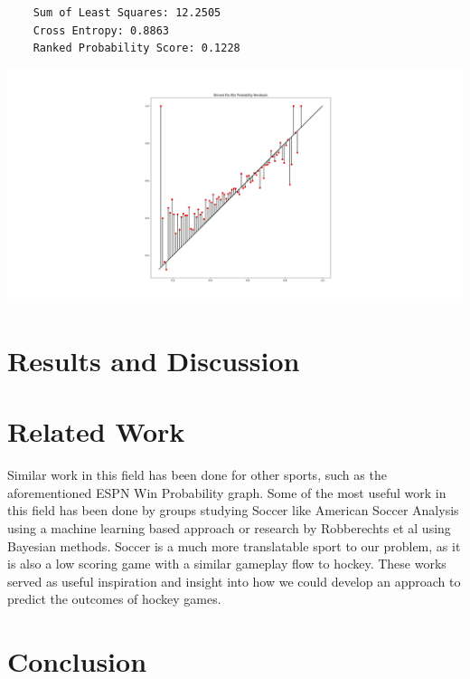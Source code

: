 \documentclass{article}
\begin{document}
\begin{minipage}{0.45\textwidth}
  \vspace*{0pt}
  \centering
  \begin{verbatim}
    Sum of Least Squares: 12.2505
    Cross Entropy: 0.8863
    Ranked Probability Score: 0.1228
  \end{verbatim}
  \end{minipage}
  \hfill
  \begin{minipage}{0.45\textwidth}
  \includegraphics[width=2\textwidth]{elo_residuals.png}\\

\end{minipage}

\section{Results and Discussion}

\section{Related Work}
Similar work in this field has been done for other sports, such as the aforementioned ESPN Win Probability graph.
Some of the most useful work in this field has been done by groups studying Soccer like American Soccer Analysis using a 
machine learning based approach \cite{richardett} or research by Robberechts et al \cite{bayesian} using Bayesian methods.
Soccer is a much more translatable sport to our problem, as it is also a low scoring game with a similar gameplay flow to hockey.
These works served as useful inspiration and insight into how we could develop an approach to predict the outcomes of hockey games.

\section{Conclusion}

\nocite{*}


\end{document}
